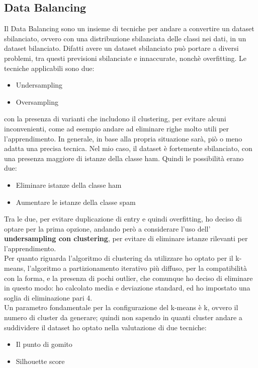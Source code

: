 \documentclass[]{article}
\begin{document}
        \subsection{Data Balancing}
            Il Data Balancing sono un insieme di tecniche per andare a convertire un dataset sbilanciato, ovvero con una distribuzione sbilanciata delle classi nei dati, in un dataset bilanciato. Difatti avere un dataset sbilanciato può portare a diversi problemi, tra questi previsioni sbilanciate e innaccurate, nonchè overfitting.
            Le tecniche applicabili sono due:
            \begin{itemize}
                \item Undersampling
                \item Oversampling
            \end{itemize}
            con la presenza di varianti che includono il clustering, per evitare alcuni inconvenienti, come ad esempio andare ad eliminare righe molto utili per l'apprendimento. In generale, in base alla propria situazione sarà, piò o meno adatta una precisa tecnica.
            Nel mio caso, il dataset è fortemente sbilanciato, con una presenza maggiore di istanze della classe ham. Quindi le possibilità erano due:
            \begin{itemize}
                \item Eliminare istanze della classe ham
                \item Aumentare le istanze della classe spam
            \end{itemize}
            Tra le due, per evitare duplicazione di entry e quindi overfitting, ho deciso di optare per la prima opzione, andando però a considerare l'uso dell' \textbf{undersampling con clustering}, per evitare di eliminare istanze rilevanti per l'apprendimento.\\
            Per quanto riguarda l'algoritmo di clustering da utilizzare ho optato per il k-means, l'algoritmo a partizionamento iterativo più diffuso, per la compatibilità con la forma, e la presenza di pochi outlier, che comunque ho deciso di eliminare in questo modo: ho calcolato media e deviazione standard, ed ho impostato una soglia di eliminazione pari 4.\\
            Un parametro fondamentale per la configurazione del k-means è k, ovvero il numero di cluster da generare; quindi non sapendo in quanti cluster andare a suddividere il dataset ho optato nella valutazione di due tecniche:
            \begin{itemize}
                \item Il punto di gomito
                \item Silhouette score
            \end{itemize}
\end{document}
